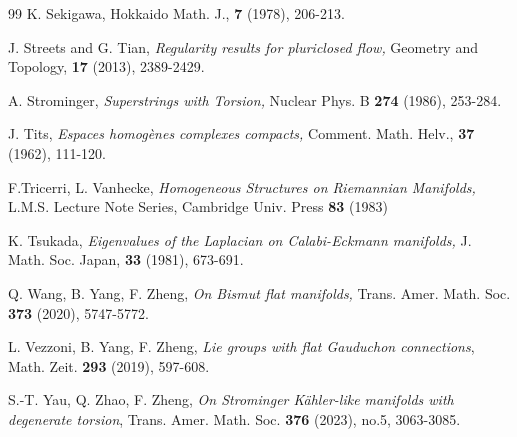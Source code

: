 \documentclass{amsart}
\numberwithin{equation}{section}
\theoremstyle{definition}
\renewcommand{\1}{\mathds{1}}
\renewcommand{\>}{\rightarrow}
\begin{document}
\begin{thebibliography}{99}
 K. Sekigawa,
\newblock Hokkaido Math. J., {\bf 7} (1978), 206-213.


 J. Streets and G. Tian, \emph{Regularity results for pluriclosed flow,} Geometry and Topology, {\bf 17} (2013), 2389-2429.

 A. Strominger,
\newblock \emph{Superstrings with Torsion,}
\newblock Nuclear Phys. B {\bf 274} (1986), 253-284.

 J. Tits,
\newblock \textit{Espaces homog\`enes complexes compacts,}
\newblock Comment. Math. Helv., \textbf{37} (1962), 111-120.

 F.Tricerri, L. Vanhecke,
\newblock \emph{Homogeneous Structures on Riemannian Manifolds,}
\newblock L.M.S. Lecture Note Series, Cambridge Univ. Press {\bf 83} (1983)

 K. Tsukada,
\newblock\emph{Eigenvalues of the Laplacian on Calabi-Eckmann manifolds,}
\newblock J. Math. Soc. Japan, \textbf{33} (1981), 673-691.



 Q. Wang, B. Yang, F. Zheng,
\newblock \textit{On Bismut flat manifolds,}
\newblock Trans. Amer. Math. Soc. \textbf{373} (2020), 5747-5772.

 L. Vezzoni, B. Yang, F. Zheng,
\newblock \textit{Lie groups with flat Gauduchon connections},
\newblock Math. Zeit. \textbf{293} (2019), 597-608.



 S.-T. Yau, Q. Zhao, F. Zheng,
\newblock \textit{On Strominger K\"ahler-like manifolds with degenerate torsion},
\newblock Trans. Amer. Math. Soc. {\bf 376} (2023), no.5, 3063-3085.



\end{thebibliography}
\end{document}
